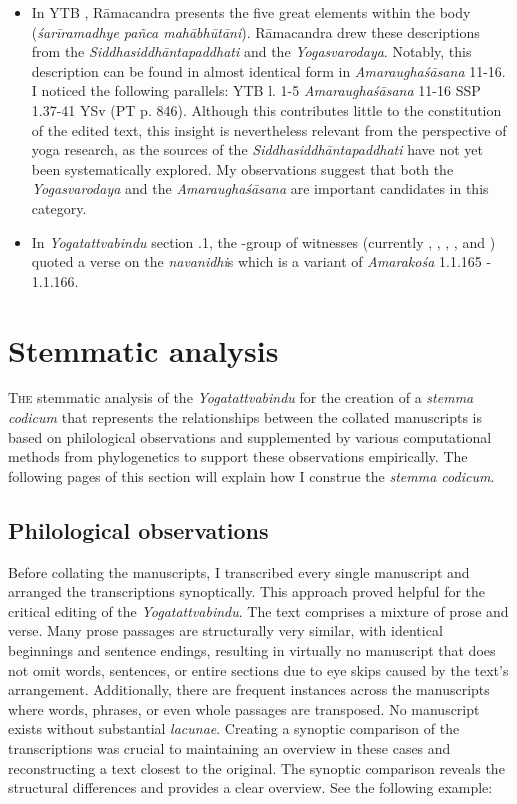 \begin{itemize}
\item In YTB , Rāmacandra presents the five great elements within the body (\textit{śarīramadhye pañca mahābhūtāni}). Rāmacandra drew these descriptions from the \emph{Siddhasiddhāntapaddhati} and the \emph{Yogasvarodaya}. Notably, this description can be found in almost identical form in \emph{Amaraughaśāsana} 11-16. I noticed the following parallels: YTB  l. 1-5 \approx \emph{Amaraughaśāsana} 11-16 \approx SSP 1.37-41 \approx YSv (PT p. 846). Although this contributes little to the constitution of the edited text, this insight is nevertheless relevant from the perspective of yoga research, as the sources of the \emph{Siddhasiddhāntapaddhati} have not yet been systematically explored. My observations suggest that both the \emph{Yogasvarodaya} and the \emph{Amaraughaśāsana} are important candidates in this category.

\item In \emph{Yogatattvabindu} section .1, the \beta-group of witnesses (currently , , , , and ) quoted a verse on the \textit{navanidhi}s which is a variant of \emph{Amarakośa} 1.1.165 - 1.1.166.
  
\end{itemize}
\newpage 
\section{Stemmatic analysis}
\label{stemma}

\lettrine[lines=2, lhang=0.2, loversize=0.25]{T}{he} stemmatic analysis of the \emph{Yogatattvabindu} for the creation of a \textit{stemma codicum} that represents the relationships between the collated manuscripts is based on philological observations and supplemented by various computational methods from phylogenetics to support these observations empirically. The following pages of this section will explain how I construe the \textit{stemma codicum}. 

\subsection{Philological observations}

Before collating the manuscripts, I transcribed every single manuscript and arranged the transcriptions synoptically. This approach proved helpful for the critical editing of the \emph{Yogatattvabindu}. The text comprises a mixture of prose and verse. Many prose passages are structurally very similar, with identical beginnings and sentence endings, resulting in virtually no manuscript that does not omit words, sentences, or entire sections due to eye skips caused by the text's arrangement. Additionally, there are frequent instances across the manuscripts where words, phrases, or even whole passages are transposed. No manuscript exists without substantial \textit{lacunae}. Creating a synoptic comparison of the transcriptions was crucial to maintaining an overview in these cases and reconstructing a text closest to the original. The synoptic comparison reveals the structural differences and provides a clear overview. See the following example:  

